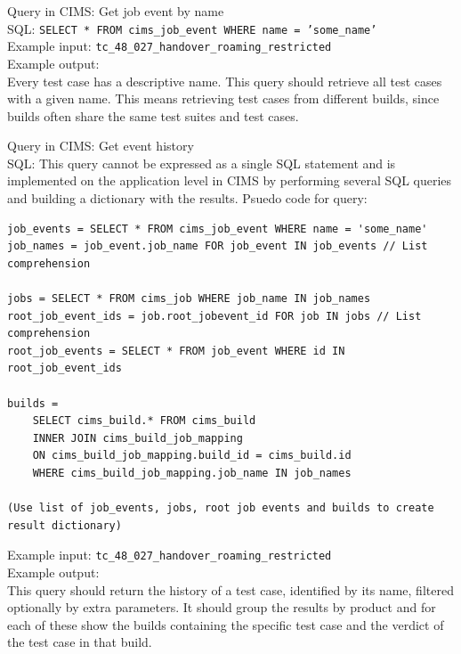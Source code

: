 \label{q:gettcbyname}
Query in CIMS: Get job event by name \\
SQL: {\tt SELECT * FROM cims\_job\_event WHERE name = 'some\_name' } \\
Example input: {\tt tc\_48\_027\_handover\_roaming\_restricted } \\
Example output: \\
Every test case has a descriptive name. This query should retrieve all test cases with a given name. This means retrieving test cases from different builds, since builds often share the same test suites and test cases.


\label{q:tchistory}
Query in CIMS: Get event history \\
SQL: This query cannot be expressed as a single SQL statement and is implemented on the application level in CIMS by performing several SQL queries and building a dictionary with the results. Psuedo code for query:
\begin{verbatim}
job_events = SELECT * FROM cims_job_event WHERE name = 'some_name'
job_names = job_event.job_name FOR job_event IN job_events // List comprehension

jobs = SELECT * FROM cims_job WHERE job_name IN job_names
root_job_event_ids = job.root_jobevent_id FOR job IN jobs // List comprehension
root_job_events = SELECT * FROM job_event WHERE id IN root_job_event_ids

builds = 
    SELECT cims_build.* FROM cims_build
    INNER JOIN cims_build_job_mapping
    ON cims_build_job_mapping.build_id = cims_build.id
    WHERE cims_build_job_mapping.job_name IN job_names

(Use list of job_events, jobs, root job events and builds to create result dictionary)

\end{verbatim}
Example input: {\tt tc\_48\_027\_handover\_roaming\_restricted } \\
Example output: \\
This query should return the history of a test case, identified by its name, filtered optionally by extra parameters. It should group the results by product and for each of these show the builds containing the specific test case and the verdict of the test case in that build.

